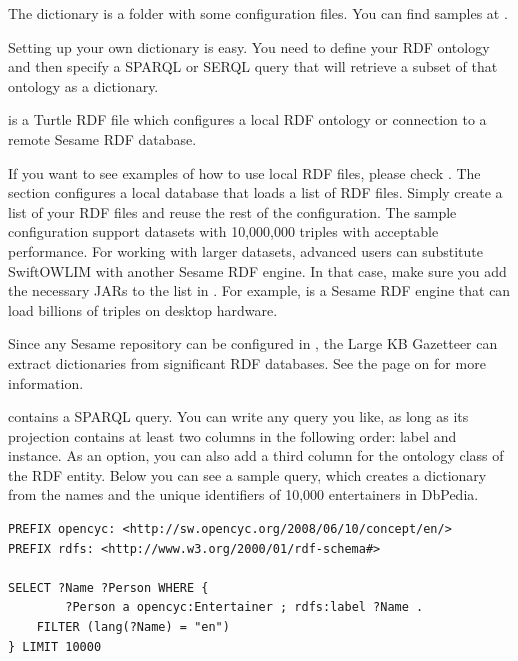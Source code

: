 
The dictionary is a folder with some configuration files. You can find samples at
.

Setting up your own dictionary is easy. You need to define your RDF ontology
and then specify a SPARQL or SERQL query that will retrieve a subset of that
ontology as a dictionary.

 is a Turtle RDF file which configures a local RDF
ontology or connection to a remote Sesame RDF database.

If you want to see examples of how to use local RDF files, please check
. The
 section configures a local
 database that loads a
list of RDF files. Simply create a list of your RDF files and reuse the rest of
the configuration. The sample configuration support datasets with 10,000,000
triples with acceptable performance. For working with larger datasets, advanced
users can substitute SwiftOWLIM with another Sesame RDF engine. In that case,
make sure you add the necessary JARs to the list in
. For example,
 is a Sesame RDF
engine that can load billions of triples on desktop hardware.

Since any Sesame repository can be configured in , the Large
KB Gazetteer can extract dictionaries from  significant RDF databases.
See the page on
 for more information.

 contains a SPARQL query. You can write any query you like,
as long as its projection contains at least two columns in the following
order: label and instance. As an option, you can also add a third column for
the ontology class of the RDF entity. Below you can see a sample query, which
creates a dictionary from the names and the unique identifiers of 10,000
entertainers in DbPedia.

\begin{pverbatimbox}
\begin{small}\begin{verbatim}
PREFIX opencyc: <http://sw.opencyc.org/2008/06/10/concept/en/>
PREFIX rdfs: <http://www.w3.org/2000/01/rdf-schema#>

SELECT ?Name ?Person WHERE {
        ?Person a opencyc:Entertainer ; rdfs:label ?Name .           
    FILTER (lang(?Name) = "en") 
} LIMIT 10000
\end{verbatim}\end{small}
\end{pverbatimbox}


